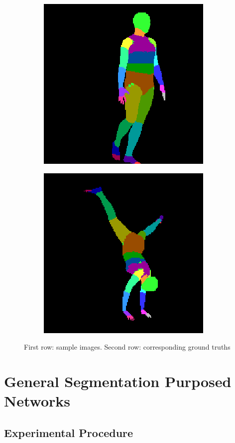 \documentclass[12pt,a4paper]{article}
\begin{document}
\begin{figure}
\begin{subfigure}{.19\textwidth}
\end{subfigure}
\begin{subfigure}{.19\textwidth}
  \centering
  \includegraphics[scale=0.3]{ung_91_62_c0003_segm_87.png}
\end{subfigure}
\begin{subfigure}{.19\textwidth}
  \centering
  \includegraphics[scale=0.3]{ung_144_02_c0006_segm_2.png}
\end{subfigure}

\caption{First row: sample images. Second row: corresponding ground truths}
\label{dataset:samples}
\end{figure}

\newpage
\section{General Segmentation Purposed Networks}

\subsection{Experimental Procedure}
\end{document}
